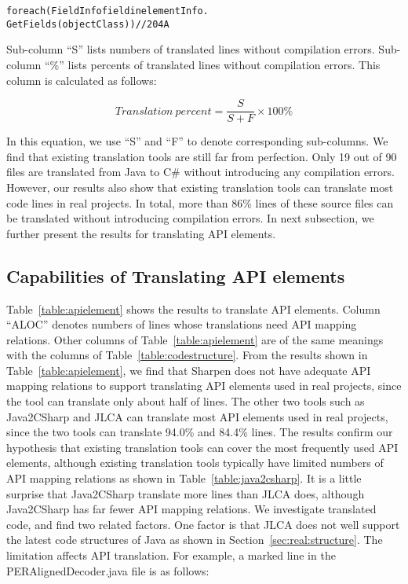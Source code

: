\begin{CodeOut}%
\begin{alltt}
foreach(FieldInfo field in elementInfo.
                     GetFields(objectClass))//204A
\end{alltt}
\end{CodeOut}


Sub-column ``S'' lists numbers of translated lines without compilation errors. Sub-column ``\%'' lists percents of translated lines without compilation errors. This column is calculated as follows:

\begin{equation}\label{eq-correctpercent}
Translation\ percent=\frac{S}{S+F}\times 100\%
\end{equation}%

In this equation, we use ``S'' and ``F'' to denote corresponding sub-columns. We find that existing translation tools are still far from perfection. Only 19 out of 90 files are translated from Java to C\# without introducing any compilation errors. However, our results also show that existing translation tools can translate most code lines in real projects. In total, more than 86\% lines of these source files can be translated without introducing compilation errors. In next subsection, we further present the results for translating API elements.

\subsection{Capabilities of Translating API elements}
\label{sec:real:api}



Table~\ref{table:apielement} shows the results to translate API elements. Column ``ALOC'' denotes numbers of lines whose translations need API mapping relations. Other columns of Table~\ref{table:apielement} are of the same meanings with the columns of Table~\ref{table:codestructure}. From the results shown in Table~\ref{table:apielement}, we find that Sharpen does not have adequate API mapping relations to support translating API elements used in real projects, since the tool can translate only about half of lines. The other two tools such as Java2CSharp and JLCA can translate most API elements used in real projects, since the two tools can translate 94.0\% and 84.4\% lines. The results confirm our hypothesis that existing translation tools can cover the most frequently used API elements, although existing translation tools typically have limited numbers of API mapping relations as shown in Table~\ref{table:java2csharp}. It is a little surprise that Java2CSharp translate more lines than JLCA does, although Java2CSharp has far fewer API mapping relations. We investigate translated code, and find two related factors. One factor is that JLCA does not well support the latest code structures of Java as shown in Section~\ref{sec:real:structure}. The limitation affects API translation. For example, a marked line in the PERAlignedDecoder.java file is as follows:

